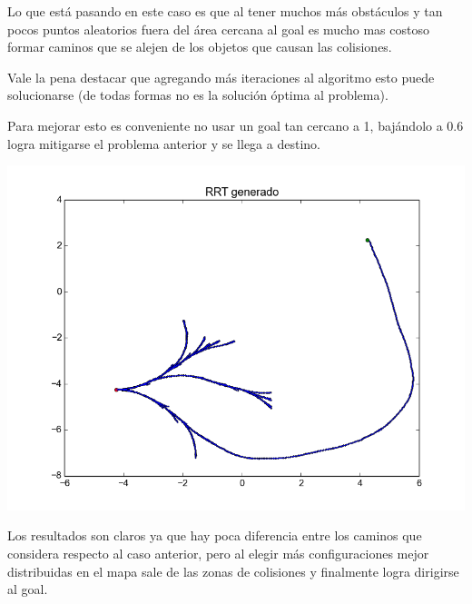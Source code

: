 Lo que está pasando en este caso es que al tener muchos más obstáculos y tan pocos puntos aleatorios fuera del área cercana al goal es mucho mas costoso formar caminos que se alejen de los objetos que causan las colisiones. 

Vale la pena destacar que agregando más iteraciones al algoritmo esto  puede solucionarse (de todas formas no es la solución óptima al problema).

Para mejorar esto es conveniente no usar un goal tan cercano a 1, bajándolo a 0.6 logra mitigarse el problema anterior y se llega a destino.

\includegraphics[scale=0.5]{tp4_imagenes/informe_goal_bias_dificil_06.png}

\pagebreak
Los resultados son claros ya que hay poca diferencia entre los caminos que considera respecto al caso anterior, pero al elegir más configuraciones mejor distribuidas en el mapa sale de las zonas de colisiones y finalmente logra dirigirse al goal.

